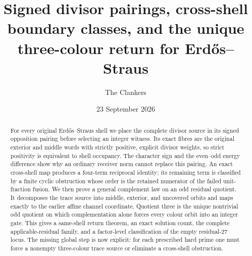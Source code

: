 \documentclass[11pt,reqno]{amsart}
\title[Signed pairings and the unique three-colour return]{Signed divisor pairings, cross-shell boundary classes, and the unique three-colour return for Erd\H{o}s--Straus}
\author{The Clankers}
\date{23 September 2026}
\begin{document}
\begin{abstract}
For every original Erd\H{o}s--Straus shell we place the complete divisor source in
its signed opposition pairing before selecting an integer witness.  Its exact
fibres are the original exterior and middle words with strictly positive,
explicit divisor weights, so strict positivity is equivalent to shell
occupancy.  The character sign and the even--odd energy difference show why an
ordinary receiver norm cannot replace this pairing.  An exact cross-shell map
produces a four-term reciprocal identity; its remaining term is classified by
a finite cyclic obstruction whose order is the retained numerator of the failed
unit-fraction fusion.  We then prove a general complement law on an odd residual
quotient.  It decomposes the trace source into middle, exterior, and uncovered
orbits and maps exactly to the earlier affine channel coordinate.  Quotient
three is the unique nontrivial odd quotient on which complementation alone
forces every colour orbit into an integer gate.  This gives a same-shell return
theorem, an exact solution count, the complete applicable-residual family, and
a factor-level classification of the empty residual-27 locus.  The missing
global step is now explicit: for each prescribed hard prime one must force a
nonempty three-colour trace source or eliminate a cross-shell obstruction.
\end{abstract}
\maketitle


\end{document}
